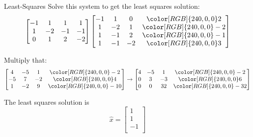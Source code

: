 \documentclass{beamer}
\begin{document}
\begin{frame}{Least-Squares}
Solve this system to get the least squares solution:
\begin{equation*}
    \left[ \begin{matrix}
        -1&		1&		1&		1\\
        1&		-2&		-1&		-1\\
        0&		1&		2&		-2\\
    \end{matrix} \right] \left[ \begin{matrix}
        -1&		1&		0&		{\color[RGB]{240, 0, 0} 2}\\
        1&		-2&		1&		{\color[RGB]{240, 0, 0} -2}\\
        1&		-1&		2&		{\color[RGB]{240, 0, 0} -1}\\
        1&		-1&		-2&		{\color[RGB]{240, 0, 0} 3}\\
    \end{matrix} \right]
\end{equation*}

Multiply that:
\begin{equation*}
    \left[ \begin{matrix}
        4&		-5&		1&		{\color[RGB]{240, 0, 0} -2}\\
        -5&		7&		-2&		{\color[RGB]{240, 0, 0} 4}\\
        1&		-2&		9&		{\color[RGB]{240, 0, 0} -10}\\
    \end{matrix} \right] \rightarrow \left[ \begin{matrix}
        4&		-5&		1&		{\color[RGB]{240, 0, 0} -2}\\
        0&		3&		-3&		{\color[RGB]{240, 0, 0} 6}\\
        0&		0&		32&		{\color[RGB]{240, 0, 0} -32}\\
    \end{matrix} \right]
\end{equation*}

The least squares solution is
\begin{equation*}
    \hat{x}=\left[ \begin{array}{c}
        1\\
        1\\
        -1\\
    \end{array} \right]
\end{equation*}
\end{frame}
\end{document}
